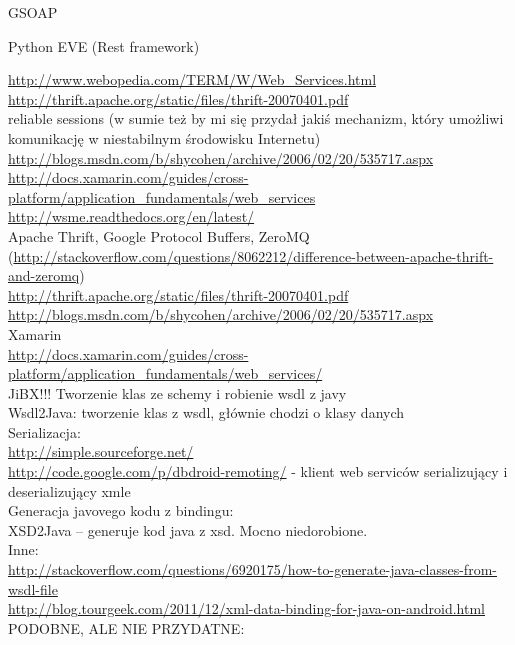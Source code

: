 GSOAP

Python EVE (Rest framework)

\url{http://www.webopedia.com/TERM/W/Web_Services.html}\\
\url{http://thrift.apache.org/static/files/thrift-20070401.pdf}\\
reliable sessions (w sumie też by mi się przydał jakiś mechanizm, który umożliwi komunikację w niestabilnym środowisku Internetu)\\
\url{http://blogs.msdn.com/b/shycohen/archive/2006/02/20/535717.aspx}\\
\url{http://docs.xamarin.com/guides/cross-platform/application_fundamentals/web_services}\\
\url{http://wsme.readthedocs.org/en/latest/}\\

Apache Thrift, Google Protocol Buffers, ZeroMQ (\url{http://stackoverflow.com/questions/8062212/difference-between-apache-thrift-and-zeromq})\\
\url{http://thrift.apache.org/static/files/thrift-20070401.pdf}\\
\url{http://blogs.msdn.com/b/shycohen/archive/2006/02/20/535717.aspx}\\
Xamarin\\
\url{http://docs.xamarin.com/guides/cross-platform/application_fundamentals/web_services/}\\

JiBX!!! Tworzenie klas ze schemy i robienie wsdl z javy\\
Wsdl2Java: tworzenie klas z wsdl, głównie chodzi o klasy danych\\

Serializacja:\\
\url{http://simple.sourceforge.net/}\\
\url{http://code.google.com/p/dbdroid-remoting/} - klient web serviców serializujący i deserializujący xmle\\
Generacja javovego kodu z bindingu:\\
XSD2Java – generuje kod java z xsd. Mocno niedorobione.\\
Inne:\\
\url{http://stackoverflow.com/questions/6920175/how-to-generate-java-classes-from-wsdl-file}\\
\url{http://blog.tourgeek.com/2011/12/xml-data-binding-for-java-on-android.html}\\
PODOBNE, ALE NIE PRZYDATNE:\\


